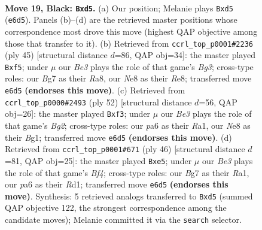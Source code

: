 \documentclass[11pt]{article}
\begin{document}
\begin{figure}[p]
\label{fig:thought-m35}
\end{figure}

\clearpage

\begin{figure}[p]\centering
\begin{subfigure}{0.46\textwidth}\centering
\resizebox{\linewidth}{!}{%
\newchessgame
\chessboard[
  setfen={rnr1n1k1/p4pbp/Pp2b3/1P1Np2R/4P3/5N2/4BPP1/R1B1K3 b Q - 2 19},
  showmover=false,
  pgfstyle=straightmove, color=movearrow, markmove={e6-d5}
]}
\caption{}
\end{subfigure}\hfill
\begin{subfigure}{0.46\textwidth}\centering
\resizebox{\linewidth}{!}{%
\newchessgame
\chessboard[
  setfen={r3r1k1/1R3ppp/3p2b1/p1pn1N2/P5P1/2P4P/1P1B1P2/R5K1 b - - 1 23},
  showmover=false,
  pgfstyle=straightmove, color=movearrow, markmove={g6-f5}
]}
\caption{}
\end{subfigure}
\\[4pt]
\begin{subfigure}{0.46\textwidth}\centering
\resizebox{\linewidth}{!}{%
\newchessgame
\chessboard[
  setfen={2br2k1/5pbp/5np1/p1N5/1r2P3/1P3nP1/6BP/R1R3BK w - - 0 27},
  showmover=false,
  pgfstyle=straightmove, color=movearrow, markmove={g2-f3}
]}
\caption{}
\end{subfigure}\hfill
\begin{subfigure}{0.46\textwidth}\centering
\resizebox{\linewidth}{!}{%
\newchessgame
\chessboard[
  setfen={4k2r/1p2b1p1/2p1bp2/2P1n2p/1P3B2/r3P1P1/PN4BP/R2R2K1 w k - 3 24},
  showmover=false,
  pgfstyle=straightmove, color=movearrow, markmove={f4-e5}
]}
\caption{}
\end{subfigure}
\caption{\textbf{Move 19, Black: \texttt{Bxd5}.} (a) Our position; Melanie plays \texttt{Bxd5} (\texttt{e6d5}). Panels (b)--(d) are the retrieved master positions whose correspondence most drove this move (highest QAP objective among those that transfer to it). (b) Retrieved from \texttt{ccrl\_top\_p0001\#2236} (ply 45) [structural distance $d$=86, QAP obj=34]: the master played \texttt{Bxf5}; under $\mu$ our \emph{Be3} plays the role of that game's \emph{Bg3}; cross-type roles: our \emph{B}g7 as their \emph{R}a8, our \emph{N}e8 as their \emph{R}e8; transferred move \texttt{e6d5} \textbf{(endorses this move)}. (c) Retrieved from \texttt{ccrl\_top\_p0000\#2493} (ply 52) [structural distance $d$=56, QAP obj=26]: the master played \texttt{Bxf3}; under $\mu$ our \emph{Be3} plays the role of that game's \emph{Bg2}; cross-type roles: our \emph{p}a6 as their \emph{R}a1, our \emph{N}e8 as their \emph{B}g1; transferred move \texttt{e6d5} \textbf{(endorses this move)}. (d) Retrieved from \texttt{ccrl\_top\_p0001\#671} (ply 46) [structural distance $d$=81, QAP obj=25]: the master played \texttt{Bxe5}; under $\mu$ our \emph{Be3} plays the role of that game's \emph{Bf4}; cross-type roles: our \emph{B}g7 as their \emph{R}a1, our \emph{p}a6 as their \emph{R}d1; transferred move \texttt{e6d5} \textbf{(endorses this move)}. Synthesis: 5 retrieved analogs transferred to \texttt{Bxd5} (summed QAP objective 122, the strongest correspondence among the candidate moves); Melanie committed it via the \texttt{search} selector.}

\end{figure}
\end{document}
